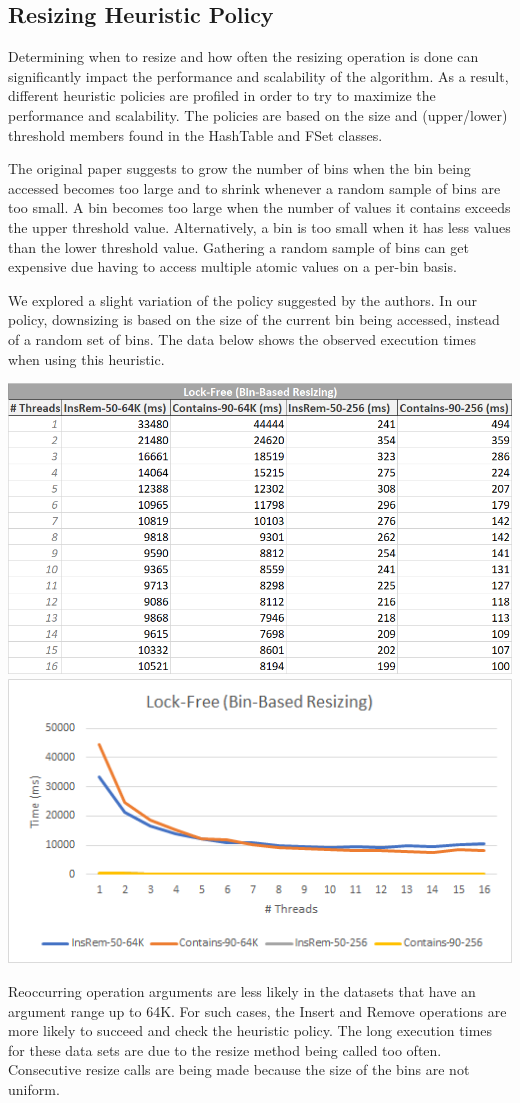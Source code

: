 \documentclass[11pt]{article} %
\begin{document}
\subsection{Resizing Heuristic Policy}

Determining when to resize and how often the resizing operation is done can significantly impact the performance and scalability of the algorithm. As a result, different heuristic policies are profiled in order to try to maximize the performance and scalability. The policies are based on the size and (upper/lower) threshold members found in the HashTable and FSet classes.

The original paper suggests to grow the number of bins when the bin being accessed becomes too large and to shrink whenever a random sample of bins are too small. A bin becomes too large when the number of values it contains exceeds the upper threshold value. Alternatively, a bin is too small when it has less values than the lower threshold value. Gathering a random sample of bins can get expensive due having to access multiple atomic values on a per-bin basis.

We explored a slight variation of the policy suggested by the authors. In our policy, downsizing is based on the size of the current bin being accessed, instead of a random set of bins. The data below shows the observed execution times when using this heuristic.

\bigskip
\includegraphics[width=0.5\linewidth]{TableA.png}
\includegraphics[width=0.5\linewidth]{GraphA.png}

Reoccurring operation arguments are less likely in the datasets that have an argument range up to 64K. For such cases, the Insert and Remove operations are more likely to succeed and check the heuristic policy. The long execution times for these data sets are due to the resize method being called too often. Consecutive resize calls are being made because the size of the bins are not uniform.
\end{document}
